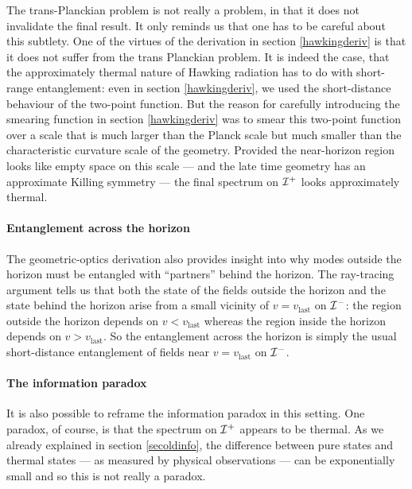 \documentclass[12pt]{article}
\def \scrip{{\cal I}^{+}}
\def \scrim{{\cal I}^{-}}
\begin{document}
The trans-Planckian problem is not really a problem, in that it does not invalidate the final result. It only reminds us that one has to be careful about this subtlety. One of the virtues of the derivation in section \ref{hawkingderiv} is that it does not suffer from the trans Planckian problem. It is indeed the case, that the approximately thermal nature of Hawking radiation has to do with short-range entanglement: even in section \ref{hawkingderiv}, we used the short-distance behaviour of the two-point function. But the reason for carefully introducing the smearing function in section \ref{hawkingderiv} was to smear this two-point function over a scale that is much larger than the Planck scale but much smaller than the characteristic curvature scale of the geometry. Provided the near-horizon region looks like empty space on this scale --- and the late time geometry has an approximate Killing symmetry ---  the final spectrum on $\scrip$  looks approximately thermal.

\paragraph{\bf Entanglement across the horizon \\}
The geometric-optics derivation also provides insight into why modes outside the horizon must be entangled with ``partners'' behind the horizon. The ray-tracing argument tells us that both the state of the fields outside the horizon and the state behind the horizon arise from a small vicinity of $v = v_{\text{last}}$ on $\scrim$:  the region outside the horizon depends on $v < v_{\text{last}}$ whereas the region inside the horizon depends on $v > v_{\text{last}}$. So the entanglement across the horizon is simply the usual short-distance entanglement of fields near $v = v_{\text{last}}$ on $\scrim$.

\paragraph{\bf The information paradox \\}
It is also possible to  reframe the information paradox in this setting.  One paradox, of course, is that the spectrum on $\scrip$ appears to be thermal. As we already explained in section \ref{secoldinfo}, the difference between pure states
 and thermal states --- as measured by physical observations --- can be exponentially small and so this is not really a paradox.
\end{document}
